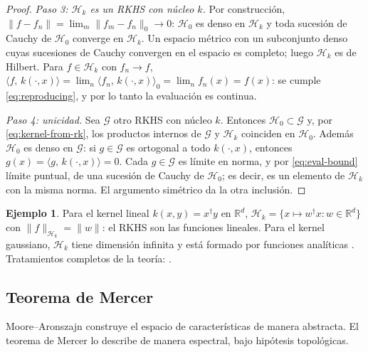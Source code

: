 \documentclass[11pt,a4paper]{article}
\newcommand{\R}{\mathbb{R}}
\newcommand{\Hk}{\mathcal{H}}
\newcommand{\dg}{\dagger}                         %
\newcommand{\inner}[2]{\langle #1,\, #2\rangle}
\newcommand{\norm}[1]{\lVert #1\rVert}
\theoremstyle{plain}
\theoremstyle{definition}
\newtheorem{ejemplo}[teorema]{Ejemplo}
\theoremstyle{remark}
\numberwithin{equation}{section}
\begin{document}
\begin{proof}
\emph{Paso 3: $\Hk_k$ es un RKHS con núcleo $k$.} Por construcción,
$\norm{f-f_n}=\lim_m\norm{f_m-f_n}_0\to0$: $\Hk_0$ es denso en $\Hk_k$ y toda sucesión de
Cauchy de $\Hk_0$ converge en $\Hk_k$. Un espacio métrico con un subconjunto denso cuyas
sucesiones de Cauchy convergen en el espacio es completo; luego $\Hk_k$ es de Hilbert. Para
$f\in\Hk_k$ con $f_n\to f$,
$\inner{f}{k(\cdot,x)}=\lim_n\inner{f_n}{k(\cdot,x)}_0=\lim_n f_n(x)=f(x)$:
se cumple \eqref{eq:reproducing}, y por lo tanto la evaluación es continua.

\emph{Paso 4: unicidad.} Sea $\mathcal G$ otro RKHS con núcleo $k$. Entonces
$\Hk_0\subset\mathcal G$ y, por \eqref{eq:kernel-from-rk}, los productos internos de
$\mathcal G$ y $\Hk_k$ coinciden en $\Hk_0$. Además $\Hk_0$ es denso en $\mathcal G$: si
$g\in\mathcal G$ es ortogonal a todo $k(\cdot,x)$, entonces $g(x)=\inner{g}{k(\cdot,x)}=0$.
Cada $g\in\mathcal G$ es límite en norma, y por \eqref{eq:eval-bound} límite puntual, de una
sucesión de Cauchy de $\Hk_0$; es decir, es un elemento de $\Hk_k$ con la misma norma. El
argumento simétrico da la otra inclusión.
\end{proof}

\begin{ejemplo}
Para el kernel lineal $k(x,y)=x^{\dg}y$ en $\R^d$, $\Hk_k=\{x\mapsto w^{\dg}x: w\in\R^d\}$
con $\norm{f}_{\Hk_k}=\norm{w}$: el RKHS son las funciones lineales. Para el kernel gaussiano,
$\Hk_k$ tiene dimensión infinita y está formado por funciones analíticas
\cite[sección 4.4]{steinwart2008}. Tratamientos completos de la teoría:
\cite{berlinet2004,paulsen2016}.
\end{ejemplo}

\subsection{Teorema de Mercer}

Moore--Aronszajn construye el espacio de características de manera abstracta. El teorema de
Mercer lo describe de manera espectral, bajo hipótesis topológicas.
\end{document}
